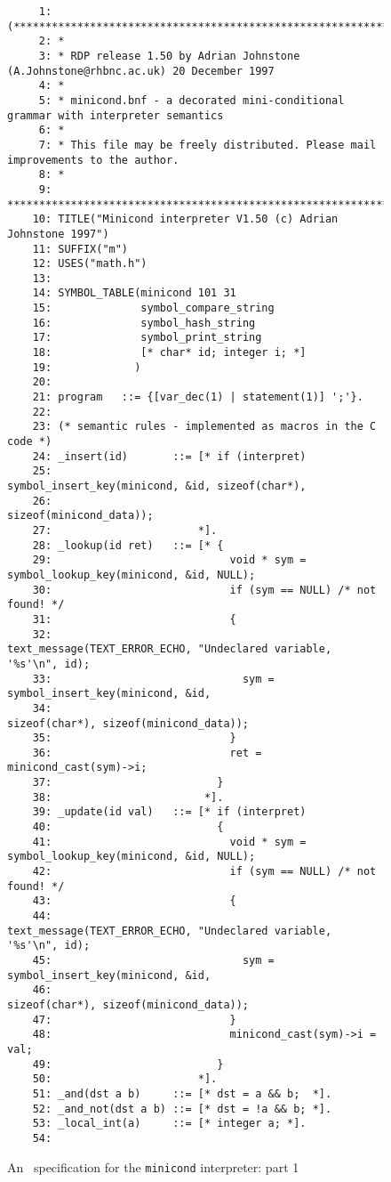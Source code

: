\begin{figure} 
\hspace*{-2cm}
\begin{minipage}{30cm}
\footnotesize 
\begin{verbatim}
     1: (*******************************************************************************
     2: *
     3: * RDP release 1.50 by Adrian Johnstone (A.Johnstone@rhbnc.ac.uk) 20 December 1997
     4: *
     5: * minicond.bnf - a decorated mini-conditional grammar with interpreter semantics
     6: *
     7: * This file may be freely distributed. Please mail improvements to the author.
     8: *
     9: *******************************************************************************)
    10: TITLE("Minicond interpreter V1.50 (c) Adrian Johnstone 1997")
    11: SUFFIX("m")
    12: USES("math.h")
    13: 
    14: SYMBOL_TABLE(minicond 101 31
    15:              symbol_compare_string
    16:              symbol_hash_string
    17:              symbol_print_string
    18:              [* char* id; integer i; *]
    19:             )
    20: 
    21: program   ::= {[var_dec(1) | statement(1)] ';'}.
    22: 
    23: (* semantic rules - implemented as macros in the C code *)
    24: _insert(id)       ::= [* if (interpret) 
    25:                            symbol_insert_key(minicond, &id, sizeof(char*), 
    26:                                              sizeof(minicond_data)); 
    27:                       *].
    28: _lookup(id ret)   ::= [* {
    29:                            void * sym = symbol_lookup_key(minicond, &id, NULL);
    30:                            if (sym == NULL) /* not found! */
    31:                            {
    32:                              text_message(TEXT_ERROR_ECHO, "Undeclared variable, '%s'\n", id);
    33:                              sym = symbol_insert_key(minicond, &id, 
    34:                                                      sizeof(char*), sizeof(minicond_data));
    35:                            }
    36:                            ret = minicond_cast(sym)->i;
    37:                          }
    38:                        *].
    39: _update(id val)   ::= [* if (interpret)
    40:                          {
    41:                            void * sym = symbol_lookup_key(minicond, &id, NULL);
    42:                            if (sym == NULL) /* not found! */
    43:                            {
    44:                              text_message(TEXT_ERROR_ECHO, "Undeclared variable, '%s'\n", id);
    45:                              sym = symbol_insert_key(minicond, &id, 
    46:                                                      sizeof(char*), sizeof(minicond_data));
    47:                            }
    48:                            minicond_cast(sym)->i = val;
    49:                          }
    50:                       *].
    51: _and(dst a b)     ::= [* dst = a && b;  *].
    52: _and_not(dst a b) ::= [* dst = !a && b; *].
    53: _local_int(a)     ::= [* integer a; *].
    54: 
\end{verbatim}
\end{minipage}
\caption{An \rdp\ specification for the {\tt minicond} interpreter: part 1}
\label{minicond:interp1}
\end{figure}

